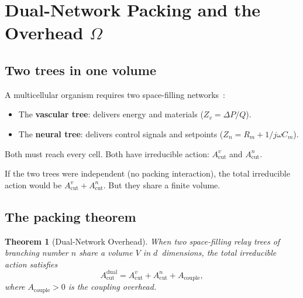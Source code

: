 \documentclass[aps,pre,twocolumn,superscriptaddress,longbibliography]{revtex4-2}
\newtheorem{theorem}{Theorem}
\newcommand{\Acut}{A_{\text{cut}}}
\newcommand{\Acouple}{A_{\text{couple}}}
\begin{document}
\section{Dual-Network Packing and the Overhead $\Omega$}
\label{sec:dual}

\subsection{Two trees in one volume}

A multicellular organism requires two space-filling
networks~\cite{PaperII}:
\begin{itemize}
  \item The \textbf{vascular tree}: delivers energy and
    materials ($Z_v = \Delta P / Q$).
  \item The \textbf{neural tree}: delivers control signals
    and setpoints ($Z_n = R_m + 1/j\omega C_m$).
\end{itemize}

Both must reach every cell.
Both have irreducible action:
$\Acut^v$ and $\Acut^n$.

If the two trees were independent (no packing interaction),
the total irreducible action would be
$\Acut^v + \Acut^n$.
But they share a finite volume.

\subsection{The packing theorem}

\begin{theorem}[Dual-Network Overhead]
\label{thm:packing}
When two space-filling relay trees of branching number
$n$ share a volume $V$ in $d$~dimensions,
the total irreducible action satisfies
\begin{equation}
  \Acut^{\text{dual}} = \Acut^v + \Acut^n + \Acouple,
  \label{eq:acut-dual}
\end{equation}
where $\Acouple > 0$ is the coupling overhead.
\end{theorem}
\end{document}
